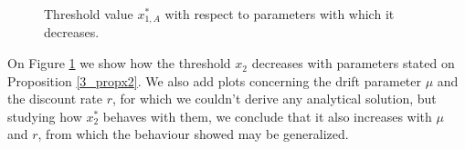 \begin{figure}[!htb]
	\begin{subfigmatrix}{6}
	\end{subfigmatrix}
	\caption{Threshold value $x^*_{1,A}$ with respect to parameters with which it decreases.}
	\label{fig:2_x2d}
\end{figure}

On Figure \ref{fig:2_x2d} we show how the threshold $x_2$ decreases with parameters stated on Proposition \ref{3_propx2}. We also add plots concerning the drift parameter $\mu$ and the discount rate $r$, for which we couldn't derive any analytical solution, but studying how $x^*_2$ behaves with them, we conclude that it also increases with $\mu$ and $r$, from which the behaviour showed may be generalized.
